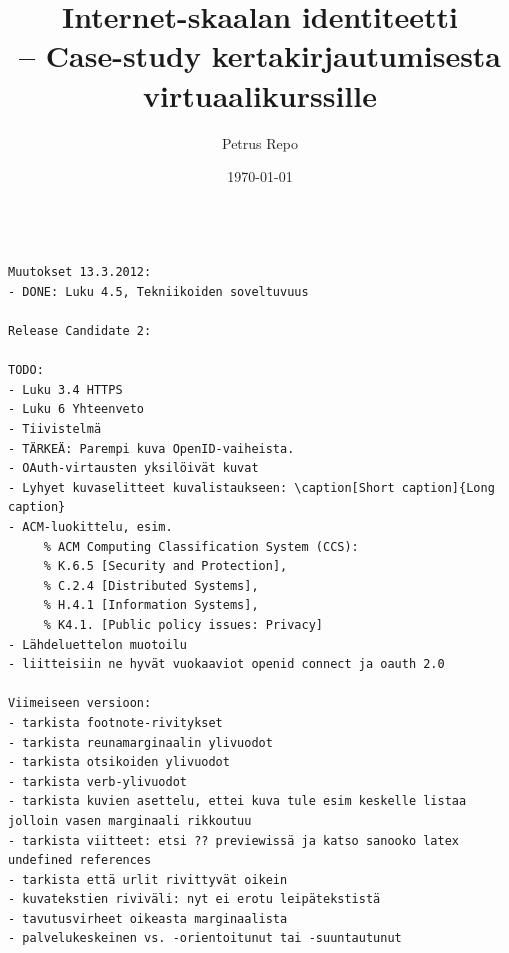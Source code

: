 \documentclass[finnish,gradu]{tktltiki}
\begin{document}
\begin{singlespacing}
\begin{verbatim}

Muutokset 13.3.2012:
- DONE: Luku 4.5, Tekniikoiden soveltuvuus

Release Candidate 2:

TODO:
- Luku 3.4 HTTPS
- Luku 6 Yhteenveto
- Tiivistelmä
- TÄRKEÄ: Parempi kuva OpenID-vaiheista.
- OAuth-virtausten yksilöivät kuvat
- Lyhyet kuvaselitteet kuvalistaukseen: \caption[Short caption]{Long caption}
- ACM-luokittelu, esim.
     % ACM Computing Classification System (CCS):
     % K.6.5 [Security and Protection],
     % C.2.4 [Distributed Systems],
     % H.4.1 [Information Systems],
     % K4.1. [Public policy issues: Privacy]
- Lähdeluettelon muotoilu
- liitteisiin ne hyvät vuokaaviot openid connect ja oauth 2.0

Viimeiseen versioon:
- tarkista footnote-rivitykset
- tarkista reunamarginaalin ylivuodot
- tarkista otsikoiden ylivuodot
- tarkista verb-ylivuodot
- tarkista kuvien asettelu, ettei kuva tule esim keskelle listaa jolloin vasen marginaali rikkoutuu
- tarkista viitteet: etsi ?? previewissä ja katso sanooko latex undefined references
- tarkista että urlit rivittyvät oikein
- kuvatekstien riviväli: nyt ei erotu leipätekstistä
- tavutusvirheet oikeasta marginaalista
- palvelukeskeinen vs. -orientoitunut tai -suuntautunut


\end{verbatim}
\end{singlespacing}


\title{Internet-skaalan identiteetti
    \\ -- Case-study kertakirjautumisesta virtuaalikurssille}

\author{Petrus Repo}
\date{\today}
\maketitle

\onehalfspacing

\subject{Tietojenkäsittelytiede}

\end{document}
